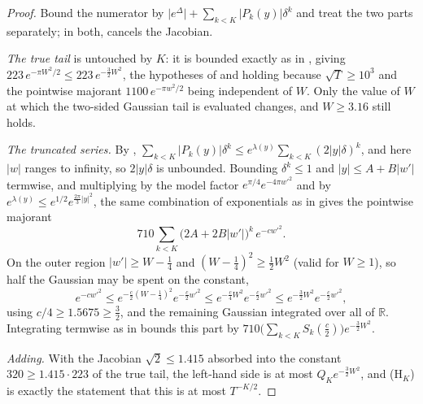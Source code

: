 \begin{proof}
Bound the numerator by $\lvert e^{\Delta}\rvert+\sum_{k<K}\lvert P_{k}(y)\rvert\delta^{k}$ and
treat the two parts separately; in both,  cancels the Jacobian.

\emph{The true tail} is untouched by $K$: it is bounded exactly as in ,
giving $223\,e^{-\pi W^{2}/2}\le223\,e^{-\frac32W^{2}}$, the hypotheses of
 and  holding because $\sqrt T\ge10^{3}$
and the pointwise majorant $1100\,e^{-\pi w^{2}/2}$ being independent of $W$.  Only the value of
$W$ at which the two-sided Gaussian tail is evaluated changes, and $W\ge3.16$ still holds.

\emph{The truncated series.}  By ,
$\sum_{k<K}\lvert P_{k}(y)\rvert\delta^{k}\le e^{\lambda(y)}\sum_{k<K}(2\lvert y\rvert\delta)^{k}$,
and here $\lvert w\rvert$ ranges to infinity, so $2\lvert y\rvert\delta$ is unbounded.
Bounding $\delta^{k}\le1$ and
$\lvert y\rvert\le A+B\lvert w'\rvert$ termwise, and multiplying by the model factor
$e^{\pi/4}e^{-4\pi w'^{2}}$ and by $e^{\lambda(y)}\le e^{1/2}e^{\frac{2\pi}3\lvert y\rvert^{2}}$,
the same combination of exponentials as in  gives the pointwise majorant
\[
  710\sum_{k<K}\bigl(2A+2B\lvert w'\rvert\bigr)^{k}\,e^{-cw'^{2}} .
\]
On the outer region $\lvert w'\rvert\ge W-\tfrac14$ and $(W-\tfrac14)^{2}\ge\tfrac12W^{2}$
(valid for $W\ge1$), so half the Gaussian may be spent on the constant,
\[
  e^{-cw'^{2}}\le e^{-\frac c2(W-\frac14)^{2}}e^{-\frac c2w'^{2}}
  \le e^{-\frac c4W^{2}}e^{-\frac c2w'^{2}}\le e^{-\frac32W^{2}}e^{-\frac c2w'^{2}},
\]
using $c/4\ge1.5675\ge\tfrac32$, and the remaining Gaussian integrated over all of $\mathbb{R}$.
Integrating termwise as in  bounds this part by
$710\bigl(\sum_{k<K}S_{k}(\tfrac c2)\bigr)e^{-\frac32W^{2}}$.

\emph{Adding.}  With the Jacobian $\sqrt2\le1.415$ absorbed into the constant $320\ge1.415\cdot223$
of the true tail, the left-hand side is at most $Q_{K}e^{-\frac32W^{2}}$, and
(H$_{K}$) is exactly the statement that this is at most $T^{-K/2}$.
\end{proof}

